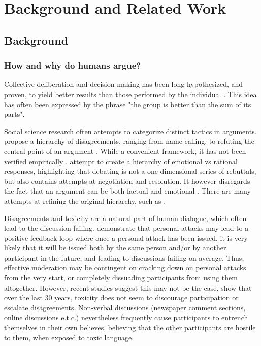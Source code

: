 %
\chapter{Background and Related Work}
\label{sec:related}



\section{Background}
\label{sec:related:sec1}


\subsection{How and why do humans argue?}
\label{sec:background:arguments-how}

Collective deliberation and decision-making has been long hypothesized, and proven, to yield better results than those performed by the individual \cite{david-collaborative, stefan-dissent}. This idea has often been expressed by the phrase "the group is better than the sum of its parts". 

Social science research often attempts to categorize distinct tactics in arguments. \cite{graham2008disagree} propose a hierarchy of disagreements, ranging from name-calling, to refuting the central point of an argument .  While a convenient framework, it has not been verified empirically \cite{dekock2022disagree}. \cite{walker-etal-2012-corpus} attempt to create a hierarchy of emotional vs rational responses, highlighting that debating is not a one-dimensional series of rebuttals, but also contains attempts at negotiation and resolution. It however disregards the fact that an argument can be both factual and emotional \cite{dekock2022disagree}. There are many attempts at refining the original hierarchy, such as \cite{benesch2016counterspeech}.

Disagreements and toxicity are a natural part of human dialogue, which often lead to the discussion failing. \cite{dekock2022disagree} demonstrate that personal attacks may lead to a positive feedback loop where once a personal attack has been issued, it is very likely that it will be issued both by the same person and/or by another participant in the future, and leading to discussions failing on average. Thus, effective moderation may be contingent on cracking down on personal attacks from the very start, or completely dissuading participants from using them altogether. However, recent studies suggest this may not be the case. \cite{Avalle2024PersistentIP} show that over the last 30 years, toxicity does not seem to discourage participation or escalate disagreements. Non-verbal discussions (newspaper comment sections, online discussions e.t.c.) nevertheless frequently cause participants to entrench themselves in their own believes, believing that the other participants are hostile to them, when exposed to toxic language.


